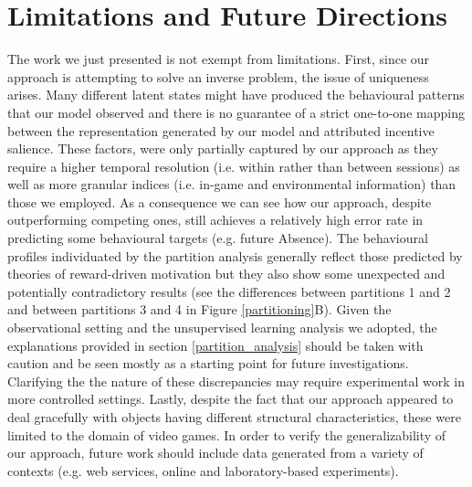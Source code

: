 \section{Limitations and Future Directions}
The work we just presented is not exempt from limitations. First, since our approach is attempting to solve an inverse problem, the issue of uniqueness arises. Many different latent states might have produced the behavioural patterns that our model observed and there is no guarantee of a strict one-to-one mapping between the representation generated by our model and attributed incentive salience. These factors, were only partially captured by our approach as they require a higher temporal resolution (i.e. within rather than between sessions) as well as more granular indices (i.e. in-game and environmental information) than those we employed. As a consequence we can see how our approach, despite outperforming competing ones, still achieves a relatively high error rate in predicting some behavioural targets (e.g. future Absence). The behavioural profiles individuated by the partition analysis generally reflect those predicted by theories of reward-driven motivation \cite{thorndike1927law,skinner1965science,berridge2004motivation} but they also show some unexpected and potentially contradictory results (see the differences between partitions 1 and 2 and between partitions 3 and 4 in Figure \ref{partitioning}B). Given the observational setting and the unsupervised learning analysis we adopted, the explanations provided in section \ref{partition_analysis} should be taken with caution and be seen mostly as a starting point for future investigations. Clarifying the the nature of these discrepancies may require experimental work in more controlled settings. Lastly, despite the fact that our approach appeared to deal gracefully  with objects having different structural characteristics, these were limited to the domain of video games. In order to verify the generalizability of our approach, future work should include data generated from a variety of contexts (e.g. web services, online and laboratory-based experiments).